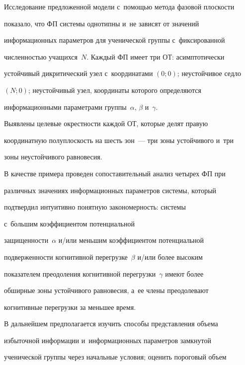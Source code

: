   


  Исследование предложенной модели с~помощью метода фазовой плос\-кости 


показало, что ФП сис\-те\-мы однотипны и~не зависят от значений 


информационных па\-ра\-мет\-ров для ученической группы с~фиксированной 


чис\-лен\-ностью учащихся~$N$. Каждый ФП имеет три ОТ: асимптотически 


устойчивый дикритический узел с~координатами $(0; 0)$; неустойчивое седло 


$(N; 0)$; неустойчивый узел, координаты которого определяются 


информационными па\-ра\-мет\-ра\-ми группы~$\alpha$, $\beta$ и~$\gamma$. 


Выявлены целевые окрест\-ности каж\-дой ОТ, которые делят правую 


координатную по\-лу\-плос\-кость на шесть зон~--- три зоны устойчивого и~три 


зоны неустойчивого равновесия. 


  


  В качестве примера проведен сопоставительный анализ четырех ФП при 


различных значениях информационных па\-ра\-мет\-ров сис\-те\-мы, который 


подтвердил интуитивно понятную за\-ко\-но\-мер\-ность: сис\-те\-мы 


с~б$\acute{\mbox{о}}$льшим коэффициентом потенциальной 


за\-щи\-щен\-ности~$\alpha$ и\!/\!или меньшим коэффициентом потенциальной 


подверженности когнитивной перегрузке~$\beta$ и\!/\!или более высоким 


показателем преодоления когнитивной пе\-ре\-груз\-ки~$\gamma$ имеют более 


обширные зоны устойчивого равновесия, а~ее члены преодолевают 


когнитивные перегрузки за меньшее время. 


  


  В дальнейшем предполагается изучить способы представления объема 


избыточной информации и~информационных па\-ра\-мет\-ров замкнутой 


ученической группы через начальные условия; оценить пороговый объем 


